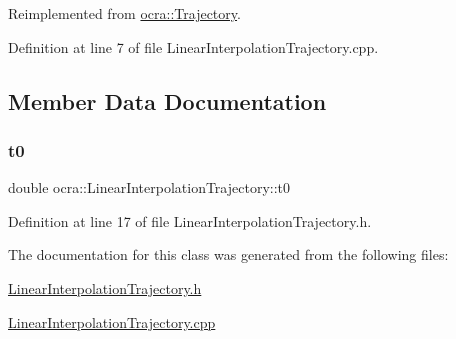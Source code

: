 Reimplemented from \hyperlink{classocra_1_1Trajectory_a2102a829e6dad497f7c773c346d499b7}{ocra\+::\+Trajectory}.



Definition at line 7 of file Linear\+Interpolation\+Trajectory.\+cpp.



\subsection{Member Data Documentation}
\hypertarget{classocra_1_1LinearInterpolationTrajectory_af29697e472859fbf1cbbf4ad30068222}{}\label{classocra_1_1LinearInterpolationTrajectory_af29697e472859fbf1cbbf4ad30068222} 
\subsubsection{\texorpdfstring{t0}{t0}}
{\footnotesize\ttfamily double ocra\+::\+Linear\+Interpolation\+Trajectory\+::t0\hspace{0.3cm}{\ttfamily [protected]}}



Definition at line 17 of file Linear\+Interpolation\+Trajectory.\+h.



The documentation for this class was generated from the following files\+:\begin{DoxyCompactItemize}
\item 
\hyperlink{LinearInterpolationTrajectory_8h}{Linear\+Interpolation\+Trajectory.\+h}\item 
\hyperlink{LinearInterpolationTrajectory_8cpp}{Linear\+Interpolation\+Trajectory.\+cpp}\end{DoxyCompactItemize}
